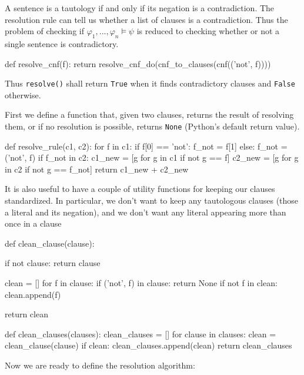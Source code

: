 \documentclass[a4paper,notitlepage]{scrartcl}
\let\phi\varphi
\begin{document}
A sentence is a tautology if and only if its negation is a contradiction.
The resolution rule can tell us whether a list of clauses is a contradiction.
Thus the problem of checking if $\phi_1,...,\phi_n\models\psi$ is reduced
   to checking whether or not a single sentence is contradictory.

\begin{code}
def resolve_cnf(f):
    return resolve_cnf_do(cnf_to_clauses(cnf(('not', f))))
\end{code}

Thus \texttt{resolve()} shall return \texttt{True} when it finds 
   contradictory clauses and \texttt{False} otherwise.

First we define a function that, given two clauses, returns the result
   of resolving them, or if no resolution is possible, returns 
   \texttt{None} (Python's default return value).

\begin{code}

def resolve_rule(c1, c2):
    for f in c1:
        if f[0] == 'not':
            f_not = f[1]
        else:
            f_not = ('not', f)
        if f_not in c2:
            c1_new = [g for g in c1 if not g == f]
            c2_new = [g for g in c2 if not g == f_not] 
            return c1_new + c2_new
\end{code}

It is also useful to have a couple of utility functions for keeping our
   clauses standardized.
In particular, we don't want to keep any tautologous clauses (those
   a literal and its negation), and we don't want any literal
   appearing more than once in a clause

\begin{code}

def clean_clause(clause):

    if not clause:
        return clause

    clean = []
    for f in clause:
        if ('not', f) in clause:
            return None
        if not f in clean:
            clean.append(f)

    return clean


def clean_clauses(clauses):
    clean_clauses = []
    for clause in clauses:
        clean = clean_clause(clause)
        if clean:
            clean_clauses.append(clean)
    return clean_clauses

\end{code}

Now we are ready to define the resolution algorithm:
\end{document}
